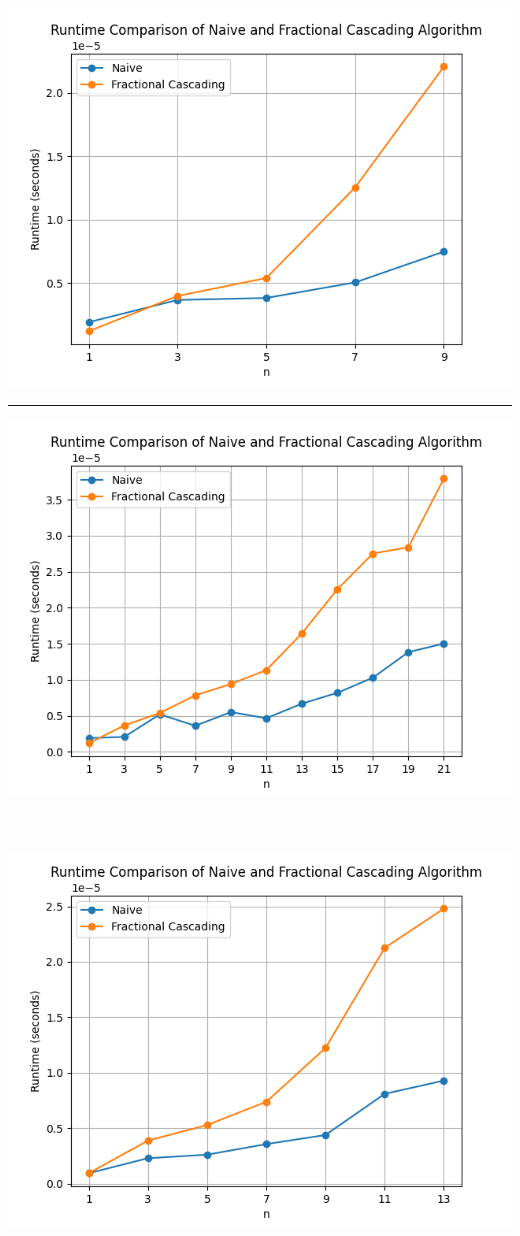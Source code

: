 \documentclass[12pt,english,]{article}
\let\origfigure\figure
\let\endorigfigure\endfigure
\renewenvironment{figure}[1][2] {
    \expandafter\origfigure\expandafter[H]
} {
    \endorigfigure
}
\begin{document}
\begin{figure}

{\centering \includegraphics[width=0.7\linewidth]{images/6_1} 

}

\caption{Running time of path 1 on $d=6$.}\label{fig:graph4}
\end{figure}

\hrule

\begin{figure}

{\centering \includegraphics[width=0.7\linewidth]{images/3_2} 

}

\caption{Running time of path 2 on $d=3$.}\label{fig:graph5}
\end{figure}

~

\begin{figure}

{\centering \includegraphics[width=0.7\linewidth]{images/4_2} 

}

\caption{Running time of path 2 on $d=4$.}\label{fig:graph6}
\end{figure}
\end{document}
